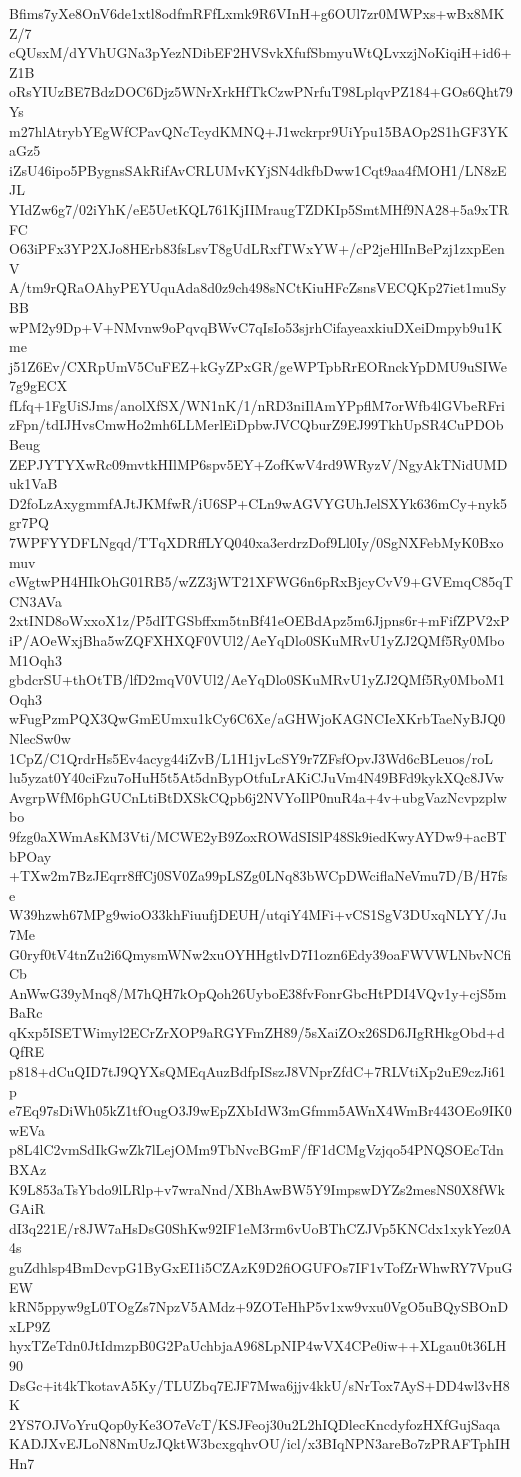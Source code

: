 Bfims7yXe8OnV6de1xtl8odfmRFfLxmk9R6VInH+g6OUl7zr0MWPxs+wBx8MKZ/7
cQUsxM/dYVhUGNa3pYezNDibEF2HVSvkXfufSbmyuWtQLvxzjNoKiqiH+id6+Z1B
oRsYIUzBE7BdzDOC6Djz5WNrXrkHfTkCzwPNrfuT98LplqvPZ184+GOs6Qht79Ys
m27hlAtrybYEgWfCPavQNcTcydKMNQ+J1wckrpr9UiYpu15BAOp2S1hGF3YKaGz5
iZsU46ipo5PBygnsSAkRifAvCRLUMvKYjSN4dkfbDww1Cqt9aa4fMOH1/LN8zEJL
YIdZw6g7/02iYhK/eE5UetKQL761KjIIMraugTZDKIp5SmtMHf9NA28+5a9xTRFC
O63iPFx3YP2XJo8HErb83fsLsvT8gUdLRxfTWxYW+/cP2jeHlInBePzj1zxpEenV
A/tm9rQRaOAhyPEYUquAda8d0z9ch498sNCtKiuHFcZsnsVECQKp27iet1muSyBB
wPM2y9Dp+V+NMvnw9oPqvqBWvC7qIsIo53sjrhCifayeaxkiuDXeiDmpyb9u1Kme
j51Z6Ev/CXRpUmV5CuFEZ+kGyZPxGR/geWPTpbRrEORnckYpDMU9uSIWe7g9gECX
fLfq+1FgUiSJms/anolXfSX/WN1nK/1/nRD3niIlAmYPpflM7orWfb4lGVbeRFri
zFpn/tdIJHvsCmwHo2mh6LLMerlEiDpbwJVCQburZ9EJ99TkhUpSR4CuPDObBeug
ZEPJYTYXwRc09mvtkHIlMP6spv5EY+ZofKwV4rd9WRyzV/NgyAkTNidUMDuk1VaB
D2foLzAxygmmfAJtJKMfwR/iU6SP+CLn9wAGVYGUhJelSXYk636mCy+nyk5gr7PQ
7WPFYYDFLNgqd/TTqXDRffLYQ040xa3erdrzDof9Ll0Iy/0SgNXFebMyK0Bxomuv
cWgtwPH4HIkOhG01RB5/wZZ3jWT21XFWG6n6pRxBjcyCvV9+GVEmqC85qTCN3AVa
2xtIND8oWxxoX1z/P5dITGSbffxm5tnBf41eOEBdApz5m6Jjpns6r+mFifZPV2xP
iP/AOeWxjBha5wZQFXHXQF0VUl2/AeYqDlo0SKuMRvU1yZJ2QMf5Ry0MboM1Oqh3
gbdcrSU+thOtTB/lfD2mqV0VUl2/AeYqDlo0SKuMRvU1yZJ2QMf5Ry0MboM1Oqh3
wFugPzmPQX3QwGmEUmxu1kCy6C6Xe/aGHWjoKAGNCIeXKrbTaeNyBJQ0NlecSw0w
1CpZ/C1QrdrHs5Ev4acyg44iZvB/L1H1jvLcSY9r7ZFsfOpvJ3Wd6cBLeuos/roL
lu5yzat0Y40ciFzu7oHuH5t5At5dnBypOtfuLrAKiCJuVm4N49BFd9kykXQc8JVw
AvgrpWfM6phGUCnLtiBtDXSkCQpb6j2NVYoIlP0nuR4a+4v+ubgVazNcvpzplwbo
9fzg0aXWmAsKM3Vti/MCWE2yB9ZoxROWdSISlP48Sk9iedKwyAYDw9+acBTbPOay
+TXw2m7BzJEqrr8ffCj0SV0Za99pLSZg0LNq83bWCpDWciflaNeVmu7D/B/H7fse
W39hzwh67MPg9wioO33khFiuufjDEUH/utqiY4MFi+vCS1SgV3DUxqNLYY/Ju7Me
G0ryf0tV4tnZu2i6QmysmWNw2xuOYHHgtlvD7I1ozn6Edy39oaFWVWLNbvNCfiCb
AnWwG39yMnq8/M7hQH7kOpQoh26UyboE38fvFonrGbcHtPDI4VQv1y+cjS5mBaRc
qKxp5ISETWimyl2ECrZrXOP9aRGYFmZH89/5sXaiZOx26SD6JIgRHkgObd+dQfRE
p818+dCuQID7tJ9QYXsQMEqAuzBdfpISszJ8VNprZfdC+7RLVtiXp2uE9czJi61p
e7Eq97sDiWh05kZ1tfOugO3J9wEpZXbIdW3mGfmm5AWnX4WmBr443OEo9IK0wEVa
p8L4lC2vmSdIkGwZk7lLejOMm9TbNvcBGmF/fF1dCMgVzjqo54PNQSOEcTdnBXAz
K9L853aTsYbdo9lLRlp+v7wraNnd/XBhAwBW5Y9ImpswDYZs2mesNS0X8fWkGAiR
dI3q221E/r8JW7aHsDsG0ShKw92IF1eM3rm6vUoBThCZJVp5KNCdx1xykYez0A4s
guZdhlsp4BmDcvpG1ByGxEI1i5CZAzK9D2fiOGUFOs7IF1vTofZrWhwRY7VpuGEW
kRN5ppyw9gL0TOgZs7NpzV5AMdz+9ZOTeHhP5v1xw9vxu0VgO5uBQySBOnDxLP9Z
hyxTZeTdn0JtIdmzpB0G2PaUchbjaA968LpNIP4wVX4CPe0iw++XLgau0t36LH90
DsGc+it4kTkotavA5Ky/TLUZbq7EJF7Mwa6jjv4kkU/sNrTox7AyS+DD4wl3vH8K
2YS7OJVoYruQop0yKe3O7eVcT/KSJFeoj30u2L2hIQDlecKncdyfozHXfGujSaqa
KADJXvEJLoN8NmUzJQktW3bcxgqhvOU/icl/x3BIqNPN3areBo7zPRAFTphIHHn7
